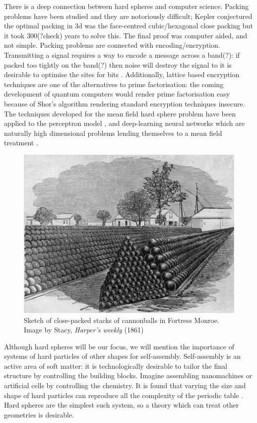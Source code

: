 \documentclass[11pt,twoside]{report}
\begin{document}
There is a deep connection between hard spheres and computer science.
Packing problems have been studied \cite{Cohn,Conway,Sloane} and they are notoriously difficult; Kepler conjectured the optimal packing in 3d was the face-centred cubic/hexagonal close packing but it took 300(?check) years to solve this.
The final proof was computer aided, and not simple.
Packing problems are connected with encoding/encryption.
Transmitting a signal requires a way to encode a message across a band(?): if packed too tightly on the band(?) then noise will destroy the signal to it is desirable to optimise the sites for bits \cite{Cohn,?,?}.
Additionally, lattice based encryption techniques are one of the alternatives to prime factorisation: the coming development of quantum computers \cite{?,?} would render prime factorisation easy because of Shor's algorithm \cite{Shor?} rendering standard encryption techniques insecure.
The techniques developed for the mean field hard sphere problem have been applied to the perceptron model \cite{?}, and deep-learning neural networks which are naturally high dimensional problems lending themselves to a mean field treatment \cite{?}.

\begin{figure}
  \includegraphics[width=0.75\linewidth,outer]{cannonballs}
  \caption[Close packed cannonballs]{
    Sketch of close-packed stacks of cannonballs in Fortress Monroe.
    Image by Stacy, \emph{Harper's weekly} (1861)}
  \label{fig:fcc}
\end{figure}

Although hard spheres will be our focus, we will mention the importance of systems of hard particles of other shapes for self-assembly.
Self-assembly is an active area of soft matter: it is technologically desirable to tailor the final structure by controlling the building blocks.
Imagine assembling nanomachines or artificial cells by controlling the chemistry.
It is found that varying the size and shape of hard particles can reproduce all the complexity of the periodic table \cite{Glotzer?,Dijkstra?}.
Hard spheres are the simplest such system, so a theory which can treat other geometries is desirable.
\end{document}
